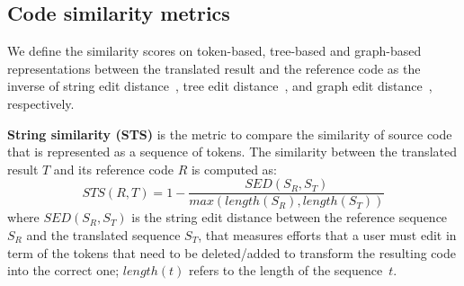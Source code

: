 \subsection{Code similarity metrics}

We define the similarity scores on token-based, tree-based and
graph-based representations between the translated result and the
reference code as the inverse of string edit
distance~\cite{levenshtein}, tree edit distance~\cite{oopsla10}, and
graph edit distance~\cite{sanfeliu}, respectively.

\textbf{String similarity (STS)} is the metric to compare the
similarity of source code that is represented as a sequence of
tokens. The similarity between the translated result $T$ and its
reference code $R$ is computed as:
$$STS(R, T) = 1 - \frac{SED(S_R, S_T)}{max\left(length(S_R), length(S_T)\right)}$$
where $SED(S_R, S_T)$ is the string edit distance between the
reference sequence $S_R$ and the translated sequence $S_T$, that
measures efforts that a user must edit in term of the tokens that need
to be deleted/added to transform the resulting code into the correct one;
$length(t)$ refers to the length of the sequence~$t$.



